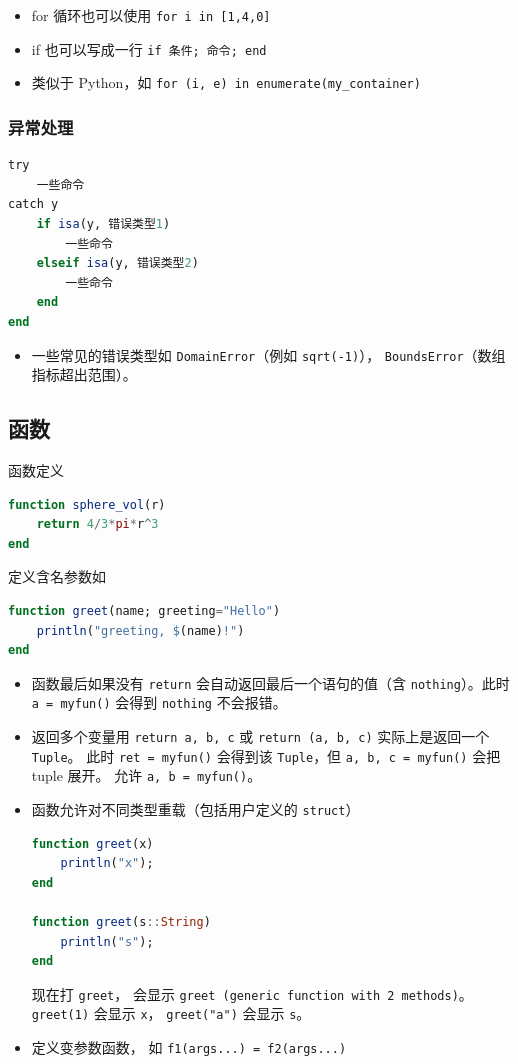 \begin{itemize}
\item for 循环也可以使用 \verb`for i in [1,4,0]`
\item if 也可以写成一行 \verb`if 条件; 命令; end`
\item 类似于 Python，如 \verb`for (i, e) in enumerate(my_container)`
\end{itemize}

\subsubsection{异常处理}
\begin{lstlisting}[language=julia]
try 
    一些命令
catch y
    if isa(y, 错误类型1)
        一些命令
    elseif isa(y, 错误类型2)
        一些命令
    end
end
\end{lstlisting}
\begin{itemize}
\item 一些常见的错误类型如 \verb`DomainError`（例如 \verb`sqrt(-1)`）， \verb`BoundsError`（数组指标超出范围）。
\end{itemize}

\subsection{函数}
函数定义
\begin{lstlisting}[language=julia]
function sphere_vol(r)
    return 4/3*pi*r^3
end
\end{lstlisting}

定义含名参数如
\begin{lstlisting}[language=julia]
function greet(name; greeting="Hello")
    println("greeting, $(name)!")
end
\end{lstlisting}

\begin{itemize}
\item 函数最后如果没有 \verb`return` 会自动返回最后一个语句的值（含 \verb`nothing`）。此时 \verb`a = myfun()` 会得到 \verb`nothing` 不会报错。
\item 返回多个变量用 \verb`return a, b, c` 或 \verb`return (a, b, c)` 实际上是返回一个 \verb`Tuple`。 此时 \verb`ret = myfun()` 会得到该 \verb`Tuple`，但 \verb`a, b, c = myfun()` 会把 tuple 展开。 允许 \verb`a, b = myfun()`。
\item 函数允许对不同类型重载（包括用户定义的 \verb`struct`）
\begin{lstlisting}[language=julia]
function greet(x)
    println("x");
end

function greet(s::String)
    println("s");
end
\end{lstlisting}
现在打 \verb`greet`， 会显示 \verb`greet (generic function with 2 methods)`。 \verb`greet(1)` 会显示 \verb`x`， \verb`greet("a")` 会显示 \verb`s`。
\item 定义变参数函数， 如 \verb`f1(args...) = f2(args...)`
\end{itemize}

